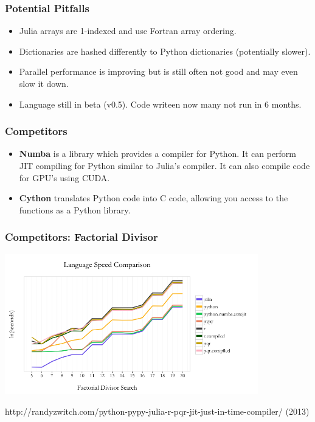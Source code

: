 \documentclass{beamer}
\begin{document}
\begin{frame}
	\frametitle{Potential Pitfalls}
	\begin{itemize}
		\item Julia arrays are 1-indexed and use Fortran array ordering. \newline

		\item Dictionaries are hashed differently to Python dictionaries (potentially slower). \newline

		\item Parallel performance is improving but is still often not good and may even slow it down. \newline

		\item Language still in beta (v0.5). Code writeen now many not run in 6 months.
	\end{itemize}
\end{frame}

\begin{frame}
	\frametitle{Competitors}
	\begin{itemize}
		\item \textbf{Numba} is a library which provides a compiler for Python. It can perform JIT compiling for Python similar to Julia's compiler. It can also compile code for GPU's using CUDA. \newline

		\item \textbf{Cython} translates Python code into C code, allowing you access to the functions as a Python library.
	\end{itemize}
\end{frame}

\begin{frame}
	\frametitle{Competitors: Factorial Divisor}

	\includegraphics[width=11cm]{Images/jit-comparison.png}

	\tiny http://randyzwitch.com/python-pypy-julia-r-pqr-jit-just-in-time-compiler/ (2013)
\end{frame}
\end{document}
